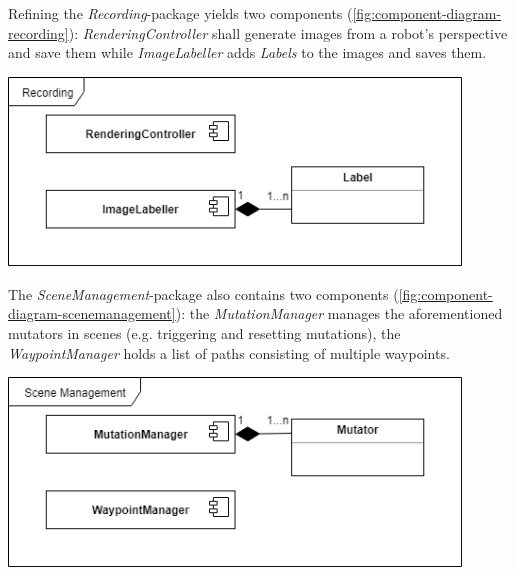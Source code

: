Refining the \textit{Recording}-package yields two components (\ref{fig:component-diagram-recording}): \textit{RenderingController} shall generate images from a robot's perspective and save them while \textit{ImageLabeller} adds \textit{Labels} to the images and saves them.

\begin{center}
\noindent\includegraphics[width=12cm]{tex/img/ch04/Component_Diagram_Recording03.png}
\label{fig:component-diagram-recording}
\end{center}

The \textit{SceneManagement}-package also contains two components (\ref{fig:component-diagram-scenemanagement}): the \textit{MutationManager} manages the aforementioned mutators in scenes (e.g. triggering and resetting mutations), the \textit{WaypointManager} holds a list of paths consisting of multiple waypoints.

\begin{center}
\noindent\includegraphics[width=12cm]{tex/img/ch04/Component_Diagram_SceneManagement02.png}
\label{fig:component-diagram-scenemanagement}
\end{center}



